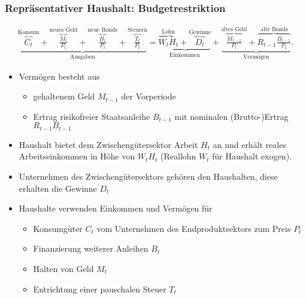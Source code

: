\documentclass[10pt]{beamer}  %
\begin{document}
\begin{frame}
\frametitle{Repr\"{a}sentativer Haushalt: Budgetrestriktion}\footnotesize
\begin{align}\label{ASHHBudget}
\underbrace{\overbrace{C_t}^\text{Konsum} + \overbrace{\frac{M_t}{P_t}}^\text{neues Geld} + \overbrace{\frac{B_t}{P_t}}^\text{neue Bonds}+\overbrace{\frac{T_t}{P_t}}^\text{Steuern}}_\text{Ausgaben}
= \underbrace{\overbrace{W_t H_t}^\text{Lohn}+\overbrace{D_t}^\text{Gewinne}}_\text{Einkommen} + \underbrace{\overbrace{\frac{M_{t-1}}{P_t}}^\text{altes Geld} + \overbrace{R_{t-1}\frac{B_{t-1}}{P_t}}^\text{alte Bonds}}_\text{Verm\"{o}gen}.
\end{align}
\begin{itemize}
  \item Verm\"{o}gen besteht aus
  \begin{itemize}\scriptsize
  \item gehaltenem Geld $M_{t-1}$ der Vorperiode
  \item Ertrag risikofreier Staatsanleihe $B_{t-1}$ mit nominalen (Brutto-)Ertrag $R_{t-1} B_{t-1}$
  \end{itemize}
  \item Haushalt bietet dem Zwischeng\"{u}tersektor Arbeit $H_t$ an und erh\"{a}lt reales Arbeitseinkommen in H\"{o}he von $W_t H_t$ (Reallohn $W_t$ f\"{u}r Haushalt exogen).
  \item Unternehmen des Zwischeng\"{u}tersektors geh\"{o}ren den Haushalten, diese erhalten die Gewinne $D_t$
  \item Haushalte verwenden Einkommen und Verm\"{o}gen f\"{u}r
  \begin{itemize}\scriptsize
  \item Konsumg\"{u}ter $C_t$ vom Unternehmen des Endproduktsektors zum Preis $P_t$
  \item Finanzierung weiterer Anleihen $B_t$
  \item Halten von Geld $M_t$
  \item Entrichtung einer pauschalen Steuer $T_t$
  \end{itemize}
\end{itemize}
\end{frame}
\end{document}
